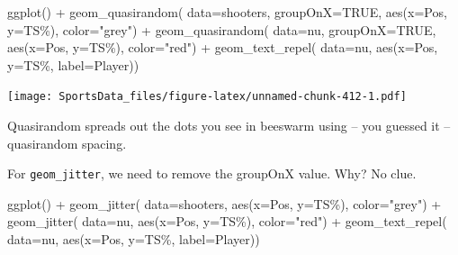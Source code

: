 \documentclass[
]{book}
\newenvironment{Shaded}{\begin{snugshade}}{\end{snugshade}}
\newcommand{\AttributeTok}[1]{\textcolor[rgb]{0.77,0.63,0.00}{#1}}
\newcommand{\ConstantTok}[1]{\textcolor[rgb]{0.00,0.00,0.00}{#1}}
\newcommand{\FunctionTok}[1]{\textcolor[rgb]{0.00,0.00,0.00}{#1}}
\newcommand{\NormalTok}[1]{#1}
\newcommand{\SpecialCharTok}[1]{\textcolor[rgb]{0.00,0.00,0.00}{#1}}
\newcommand{\StringTok}[1]{\textcolor[rgb]{0.31,0.60,0.02}{#1}}
\begin{document}
\begin{Shaded}
\begin{Highlighting}[]
\FunctionTok{ggplot}\NormalTok{() }\SpecialCharTok{+} 
  \FunctionTok{geom\_quasirandom}\NormalTok{(}
    \AttributeTok{data=}\NormalTok{shooters, }
    \AttributeTok{groupOnX=}\ConstantTok{TRUE}\NormalTok{, }
    \FunctionTok{aes}\NormalTok{(}\AttributeTok{x=}\NormalTok{Pos, }\AttributeTok{y=}\StringTok{\textasciigrave{}}\AttributeTok{TS\%}\StringTok{\textasciigrave{}}\NormalTok{), }\AttributeTok{color=}\StringTok{"grey"}\NormalTok{) }\SpecialCharTok{+} 
  \FunctionTok{geom\_quasirandom}\NormalTok{(}
    \AttributeTok{data=}\NormalTok{nu, }
    \AttributeTok{groupOnX=}\ConstantTok{TRUE}\NormalTok{, }
    \FunctionTok{aes}\NormalTok{(}\AttributeTok{x=}\NormalTok{Pos, }\AttributeTok{y=}\StringTok{\textasciigrave{}}\AttributeTok{TS\%}\StringTok{\textasciigrave{}}\NormalTok{), }\AttributeTok{color=}\StringTok{"red"}\NormalTok{) }\SpecialCharTok{+} 
  \FunctionTok{geom\_text\_repel}\NormalTok{(}
    \AttributeTok{data=}\NormalTok{nu, }
    \FunctionTok{aes}\NormalTok{(}\AttributeTok{x=}\NormalTok{Pos, }\AttributeTok{y=}\StringTok{\textasciigrave{}}\AttributeTok{TS\%}\StringTok{\textasciigrave{}}\NormalTok{, }\AttributeTok{label=}\NormalTok{Player))}
\end{Highlighting}
\end{Shaded}

\texttt{[image: SportsData\_files/figure-latex/unnamed-chunk-412-1.pdf]}

Quasirandom spreads out the dots you see in beeswarm using -- you guessed it -- quasirandom spacing.

For \texttt{geom\_jitter}, we need to remove the groupOnX value. Why? No clue.

\begin{Shaded}
\begin{Highlighting}[]
\FunctionTok{ggplot}\NormalTok{() }\SpecialCharTok{+} 
  \FunctionTok{geom\_jitter}\NormalTok{(}
    \AttributeTok{data=}\NormalTok{shooters, }
    \FunctionTok{aes}\NormalTok{(}\AttributeTok{x=}\NormalTok{Pos, }\AttributeTok{y=}\StringTok{\textasciigrave{}}\AttributeTok{TS\%}\StringTok{\textasciigrave{}}\NormalTok{), }\AttributeTok{color=}\StringTok{"grey"}\NormalTok{) }\SpecialCharTok{+} 
  \FunctionTok{geom\_jitter}\NormalTok{(}
    \AttributeTok{data=}\NormalTok{nu, }
    \FunctionTok{aes}\NormalTok{(}\AttributeTok{x=}\NormalTok{Pos, }\AttributeTok{y=}\StringTok{\textasciigrave{}}\AttributeTok{TS\%}\StringTok{\textasciigrave{}}\NormalTok{), }\AttributeTok{color=}\StringTok{"red"}\NormalTok{) }\SpecialCharTok{+} 
  \FunctionTok{geom\_text\_repel}\NormalTok{(}
    \AttributeTok{data=}\NormalTok{nu, }
    \FunctionTok{aes}\NormalTok{(}\AttributeTok{x=}\NormalTok{Pos, }\AttributeTok{y=}\StringTok{\textasciigrave{}}\AttributeTok{TS\%}\StringTok{\textasciigrave{}}\NormalTok{, }\AttributeTok{label=}\NormalTok{Player))}
\end{Highlighting}
\end{Shaded}
\end{document}
